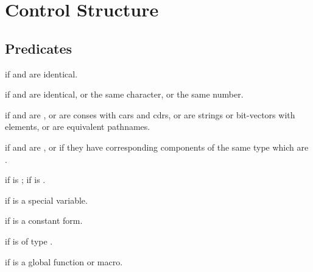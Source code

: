 %
%

\section{Control Structure}

\subsection{Predicates}
\begin{LIST}{1cm}

  {
  \retval{\T} if  and  are identical.
  }

  {
  \retval{\T} if  and 
  are identical, or the same character, or the same number.
  }

  {
  \retval{\T} if  and 
  are , or are conses with  cars and cdrs, or are
  strings or bit-vectors with   elements, or are equivalent pathnames.
  }

  {
  \retval{\T} if  and 
  are , or if they have corresponding components of the same
  type which are .
  }

  {
  \retval{\NIL} if  is \T; \retval{\T} if  is \NIL.
  }

  {
  \retval{\T} if  is a special variable.
  }

  {
  \retval{\T} if  is a constant form.
  }

  {
  \retval{\T} if  is of type .
  }

  {
  \retval{\T} if  is a global function or macro.
  }


\end{LIST}


